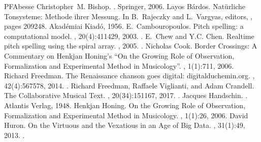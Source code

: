 \documentclass[letterpaper,10pt,english]{sphinxmanual}
\begin{document}
\begin{sphinxthebibliography}{PFAbesse}
Christopher M. Bishop. . Springer, 2006.
Layos Bárdos. Natürliche Tonsysteme: Methode ihrer Messung. In B. Rajeczky and L. Vargyas, editors, , pages 209\textendash{}\textendash{}248. Akadémiai Kiadó, 1956.
E. Cambouropoulos. Pitch spelling: a computational model. , 20(4):411\textendash{}429, 2003. .
E. Chew and Y.\sphinxhyphen{}C. Chen. Real\sphinxhyphen{}time pitch spelling using the spiral array. , 2005. .
Nicholas Cook. Border Crossings: A Commentary on Henkjan Honing’s “On the Growing Role of Observation, Formalization and Experimental Method in Musicology”. , 1(1):7\textendash{}11, 2006.
Richard Freedman. The Renaissance chanson goes digital: digitalduchemin.org. , 42(4):567\textendash{}578, 2014. .
Richard Freedman, Raffaele Viglianti, and Adam Crandell. The Collaborative Musical Text. , 20(3\textendash{}4):151\textendash{}167, 2017. .
Jacques Handschin. . Atlantis Verlag, 1948.
Henkjan Honing. On the Growing Role of Observation, Formalization and Experimental Method in Musicology. , 1(1):2\textendash{}6, 2006.
David Huron. On the Virtuous and the Vexatious in an Age of Big Data. , 31(1):4\textendash{}9, 2013. .

\end{sphinxthebibliography}
\end{document}
